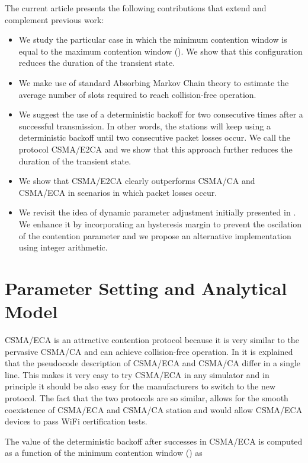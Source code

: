 \documentclass[journal]{IEEEtran}
\begin{document}
The current article presents the following contributions that extend and complement previous work:
\begin{itemize} 
\item We study the particular case in which the minimum contention window is equal to the maximum contention window (). We show that this configuration reduces the duration of the transient state.
\item We make use of standard Absorbing Markov Chain theory to estimate the average number of slots required to reach collision-free operation.
\item We suggest the use of a deterministic backoff for two consecutive times after a successful transmission. In other words, the stations will keep using a deterministic backoff until two consecutive packet losses occur. We call the protocol CSMA/E2CA and we show that this approach further reduces the duration of the transient state.
\item We show that CSMA/E2CA clearly outperforms CSMA/CA and CSMA/ECA in scenarios in which packet losses occur.
\item We revisit the idea of dynamic parameter adjustment initially presented in \cite{barcelo2010dpa}. We enhance it by incorporating an hysteresis margin to prevent the oscilation of the contention parameter and we propose an alternative implementation using integer arithmetic. 
\end{itemize}

\section{Parameter Setting and Analytical Model}
\label{sec:analysis}
CSMA/ECA is an attractive contention protocol because it is very similar to the pervasive CSMA/CA and can achieve collision-free operation. In \cite{barcelo2010fcc} it is explained that the pseudocode description of CSMA/ECA and CSMA/CA differ in a single line. This makes it very easy to try CSMA/ECA in any simulator and in principle it should be also easy for the manufacturers to switch to the new protocol. The fact that the two protocols are so similar, allows for the smooth coexistence of CSMA/ECA and CSMA/CA station and would allow CSMA/ECA devices to pass WiFi certification tests.

The value of the deterministic backoff after successes in CSMA/ECA is computed as a function of the minimum contention window () as
\end{document}
